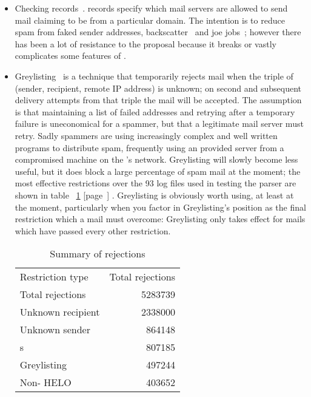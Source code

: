 \documentclass[a4paper,12pt,draft]{article}
\newcommand{\refwithpage}[1]{%
    \empty{}\ref{#1} [page~\pageref{#1}]%
}
\begin{document}
\begin{itemize}

    \item Checking \SPF{} records~\cite{openspf,
        wikipedia-spf}.  \SPF{} records specify which mail servers are allowed
        to send mail claiming to be from a particular domain.  The
        intention is to reduce spam from faked sender addresses,
        backscatter~\cite{postfix-backscatter} and
        joe jobs~\cite{wikipedia-joe-job}; however there has been a lot of
        resistance to the proposal because it breaks or vastly complicates
        some features of \SMTP{}\@.

    \item Greylisting~\cite{greylisting} is a technique that temporarily
        rejects mail when the triple of (sender, recipient, remote IP
        address) is unknown; on second and subsequent delivery attempts
        from that triple the mail will be accepted.  The assumption is that
        maintaining a list of failed addresses and retrying after a
        temporary failure is uneconomical for a spammer, but that a
        legitimate mail server must retry.  Sadly spammers are using
        increasingly complex and well written programs to distribute spam,
        frequently using an \ISP{} provided \SMTP{} server from a
        compromised machine on the \ISP{}'s network.  Greylisting will
        slowly become less useful, but it does block a large percentage of
        spam mail at the moment; the most effective restrictions over the
        93 log files used in testing the parser are shown in
        table~\refwithpage{Summary of rejections}.  Greylisting is
        obviously worth using, at least at the moment, particularly when
        you factor in Greylisting's position as the final restriction which
        a mail must overcome: Greylisting only takes effect for mails which
        have passed every other restriction.

        \begin{table}[ht]
            \caption{Summary of rejections}\label{Summary of rejections}
            \begin{tabular}[]{lr}
                Restriction type    & Total rejections  \\
                Total rejections    & 5283739           \\
                Unknown recipient   & 2338000           \\
                Unknown sender      & 864148            \\
                \RBL{}s             & 807185            \\
                Greylisting         & 497244            \\
                Non-\FQDN{} HELO    & 403652            \\
            \end{tabular}
        \end{table}


\end{itemize}
\end{document}
